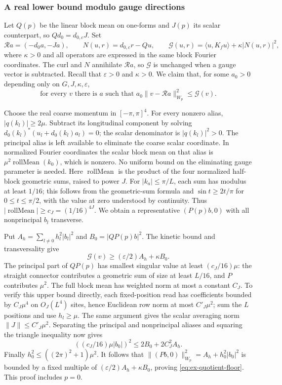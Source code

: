 \subsubsection{A real lower bound modulo gauge directions}
Let $Q(p)$ be the linear block mean on one-forms and $J(p)$ its scalar
counterpart, so $Qd_0=d_{0,c}J$. Set
\[
 \mathcal R a=(-d_0a,-Ja),\qquad
 N(u,r)=d_{0,c}r-Qu,
 \qquad \mathcal G(u,r)=\langle u,K_fu\rangle+\kappa|N(u,r)|^2,
\]
where $\kappa>0$ and all operators are expressed in the same block
Fourier coordinates. The curl and $N$ annihilate $\mathcal R a$, so
$\mathcal G$ is unchanged when a gauge vector is subtracted.
Recall that $\varepsilon>0$ and $\kappa>0$. We claim that, for some
$a_0>0$ depending only on $G,J,\kappa,\varepsilon$,
\begin{equation}\label{eq:ex-quotient-floor}
        \text{for every }v\text{ there is }a\text{ such that }
        a_0\|v-\mathcal R a\|_{W_p}^2\leq\mathcal G(v).
\end{equation}

Choose the real coarse momentum in $[-\pi,\pi]^4$. For every nonzero
alias, $|q(k_l)|\geq2\mu$. Subtract its longitudinal component by
solving $d_0(k_l)^*(u_l+d_0(k_l)a_l)=0$; the scalar denominator is
$|q(k_l)|^2>0$. The principal alias is left available to eliminate the
coarse scalar coordinate. In normalized Fourier coordinates the scalar
block mean on that alias is $\mu^2\operatorname{rollMean}(k_0)$,
which is nonzero. No uniform bound on the eliminating gauge parameter
is needed. Here $\operatorname{rollMean}$ is the product
of the four normalized half-block geometric sums, raised to power $J$.
For $|k_a|\leq\pi/L$, each sum has modulus at least $1/16$;
this follows from the geometric-sum formula and
$\sin t\geq2t/\pi$ for $0\leq t\leq\pi/2$, with the value at zero
understood by continuity. Thus $|\operatorname{rollMean}|\geq c_J=(1/16)^{4J}$. We obtain a representative $(P(p)b,0)$ with all
nonprincipal $b_l$ transverse.

Put $A_h=\sum_{l\ne0}h_l^2|b_l|^2$ and
$B_0=|QP(p)b|^2$. The kinetic bound and transversality give
\[
             \mathcal G(v)\geq(\varepsilon/2)A_h+\kappa B_0.
\]
The principal part of $QP(p)$ has smallest singular value at least
$(c_J/16)\mu$: the straight connector contributes a geometric sum of
size at least $L/16$, and $P$ contributes $\mu^2$.
The full block mean has weighted norm at most a constant $C_J$.
To verify this upper bound directly, each fixed-position read has
coefficients bounded by $C_J\mu^4$ on $O_J(L^4)$ sites, hence Euclidean
row norm at most $C'_J\mu^2$; sum the $L$ positions and use
$h_l\geq\mu$. The same argument gives the scalar averaging norm
$\|J\|\leq C'_J\mu^2$.
Separating the principal and nonprincipal aliases and squaring the
triangle inequality now gives
\[
 ((c_J/16)\mu|b_0|)^2\leq2B_0+2C_J^2A_h.
\]
Finally $h_0^2\leq((2\pi)^2+1)\mu^2$. It follows that
$\|(P b,0)\|_{W_p}^2=A_h+h_0^2|b_0|^2$ is bounded by a fixed
multiple of $(\varepsilon/2)A_h+\kappa B_0$, proving
\eqref{eq:ex-quotient-floor}. This proof includes $p=0$.


